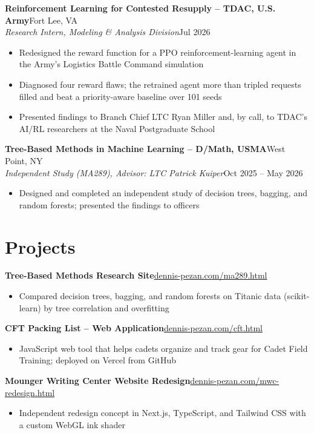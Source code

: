 \documentclass[10pt,letterpaper]{article}
\let\oldsection\section
\renewcommand{\section}{\needspace{3\baselineskip}\oldsection}
\newcommand{\entry}[4]{%
  \needspace{3\baselineskip}%
  \textbf{#1}\hfill #2\\
  \textit{#3}\hfill #4\par}
\newcommand{\proj}[3]{%
  \needspace{3\baselineskip}%
  \textbf{#1}\hfill\href{#3}{#2}\par}
\begin{document}
\entry{Reinforcement Learning for Contested Resupply -- TDAC, U.S. Army}{Fort Lee, VA}{Research Intern, Modeling \& Analysis Division}{Jul 2026}
\begin{itemize}
  \item Redesigned the reward function for a PPO reinforcement-learning agent in the Army's Logistics Battle Command simulation
  \item Diagnosed four reward flaws; the retrained agent more than tripled requests filled and beat a priority-aware baseline over 101 seeds
  \item Presented findings to Branch Chief LTC Ryan Miller and, by call, to TDAC's AI/RL researchers at the Naval Postgraduate School
\end{itemize}

\entry{Tree-Based Methods in Machine Learning -- D/Math, USMA}{West Point, NY}{Independent Study (MA289), Advisor: LTC Patrick Kuiper}{Oct 2025 -- May 2026}
\begin{itemize}
  \item Designed and completed an independent study of decision trees, bagging, and random forests; presented the findings to officers
\end{itemize}

\section{Projects}
\proj{Tree-Based Methods Research Site}{dennis-pezan.com/ma289.html}{https://dennis-pezan.com/ma289.html}
\begin{itemize}
  \item Compared decision trees, bagging, and random forests on Titanic data (scikit-learn) by tree correlation and overfitting
\end{itemize}
\proj{CFT Packing List -- Web Application}{dennis-pezan.com/cft.html}{https://dennis-pezan.com/cft.html}
\begin{itemize}
  \item JavaScript web tool that helps cadets organize and track gear for Cadet Field Training; deployed on Vercel from GitHub
\end{itemize}
\proj{Mounger Writing Center Website Redesign}{dennis-pezan.com/mwc-redesign.html}{https://dennis-pezan.com/mwc-redesign.html}
\begin{itemize}
  \item Independent redesign concept in Next.js, TypeScript, and Tailwind CSS with a custom WebGL ink shader
\end{itemize}
\end{document}
